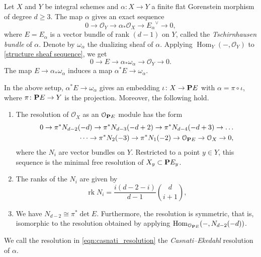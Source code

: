 \documentclass{amsart}
\renewcommand{\O}{{\mathcal O}}
\renewcommand {\P}{{\bf P}}
\providecommand {\from}{{\colon}}
\providecommand{\Hom}{\operatorname{Hom}}
\providecommand{\rk}{\operatorname{rk}} \declaretheorem[sibling=theorem,style=remark]{remark}
\numberwithin{equation}{section}
\begin{document}
Let $X$ and $Y$ be integral schemes and $\alpha \from X \to Y$ a finite flat Gorenstein morphism of degree $d \geq 3$.
The map $\alpha$ gives an exact sequence
\begin{equation}\label{structure sheaf sequence}
  0 \to \O_Y \to \alpha_* \O_X \to {E_\alpha}^\vee \to 0,
\end{equation}
where $E = E_\alpha$ is a vector bundle of rank $(d-1)$ on $Y$, called the \emph{Tschirnhausen bundle} of $\alpha$.
Denote by $\omega_\alpha$ the dualizing sheaf of $\alpha$.
Applying $\Hom_Y(-,\O_Y)$ to \eqref{structure sheaf sequence}, we get
\begin{equation}\label{dual structure sheaf sequence}
  0 \to E \to \alpha_* \omega_\alpha \to \O_Y \to 0.
\end{equation}
The map $E \to \alpha_* \omega_\alpha$ induces a map $\alpha^* E \to \omega_\alpha$.
\begin{theorem}
  \label{thm:CE}
  In the above setup, $\alpha^* E \to \omega_\alpha$ gives an embedding $\iota \from X \to \P E$ with $\alpha  = \pi \circ \iota$, where $\pi \from \P E \to Y$ is the projection.
  Moreover, the following hold.
  \begin{enumerate}
  \item The resolution of $\O_X$ as an $\O_{\P E}$ module has the form
    \begin{equation}\label{eqn:casnati_resolution}
      \begin{split}
        0 \to \pi^* N_{d-2} (-d) \to \pi^* N_{d-3}(-d+2) \to \pi^*N_{d-4}(-d+3) \to \dots \\
        \dots \to \pi^*N_2(-3) \to \pi^*N_1(-2) \to \O_{\P E} \to \O_X \to 0,
      \end{split}
    \end{equation}
    where the $N_i$ are vector bundles on $Y$.
    Restricted to a point $y \in Y$, this sequence is the minimal free resolution of $X_y \subset \P E_y$.
  \item The ranks of the $N_i$ are given by
    \[ \rk N_i = \frac{i(d-2-i)}{d-1} {d \choose {i+1}},\]
  \item We have $N_{d-2} \cong \pi^* \det E$.
    Furthermore, the resolution is symmetric, that is, isomorphic to the resolution obtained by applying $\Hom_{\O_{\P E}}(-, N_{d-2}(-d))$.
  \end{enumerate}
\end{theorem}
We call the resolution in \eqref{eqn:casnati_resolution} the \emph{Casnati--Ekedahl} resolution of $\alpha$.
\end{document}
